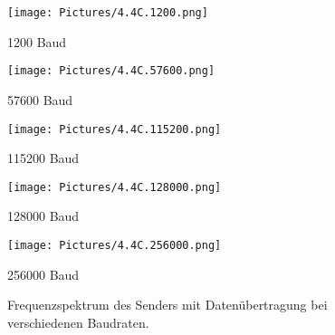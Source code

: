     \begin{figure}[H]
        \centering
        \begin{minipage}{0.47\textwidth}
            \centering
            \texttt{[image: Pictures/4.4C.1200.png]}
            \caption*{1200 Baud}
        \end{minipage}
        \hfill
        \begin{minipage}{0.47\textwidth}
            \centering
            \texttt{[image: Pictures/4.4C.57600.png]}
            \caption*{57600 Baud}
        \end{minipage}

        \vspace{0.5cm}

        \begin{minipage}{0.47\textwidth}
            \centering
            \texttt{[image: Pictures/4.4C.115200.png]}
            \caption*{115200 Baud}
        \end{minipage}
        \hfill
        \begin{minipage}{0.47\textwidth}
            \centering
            \texttt{[image: Pictures/4.4C.128000.png]}
            \caption*{128000 Baud}
        \end{minipage}

        \vspace{0.5cm}
        \begin{minipage}{0.1\textwidth}
        \end{minipage}
        \hfill
        \begin{minipage}{0.47\textwidth}
            \centering
            \texttt{[image: Pictures/4.4C.256000.png]}
            \caption*{256000 Baud}
        \end{minipage}
        \hfill
        \begin{minipage}{0.1\textwidth}
        \end{minipage}

        \caption{Frequenzspektrum des Senders mit Datenübertragung bei verschiedenen Baudraten.}
        \label{fig:MitDaten}
    \end{figure}

